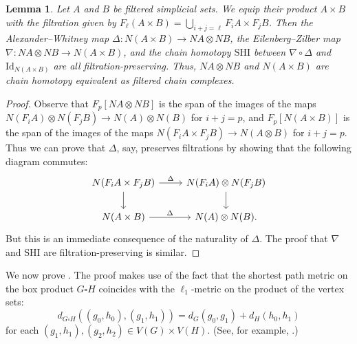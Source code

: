 \documentclass[a4paper, 11 pt, oneside, reqno]{amsart}
\newtheorem{lemma}{Lemma}
\numberwithin{lemma}{section}
\theoremstyle{definition}
\begin{document}
\begin{lemma}\label{lemma-EZ-filtered}
    Let $A$ and $B$ be filtered simplicial sets. We equip their product $A\times B$ with the filtration given by $F_\ell (A\times B) = \bigcup_{i+j=\ell} F_iA\times F_jB$.
    Then the Alexander--Whitney map
    $\Delta\colon N(A\times B)\to NA\otimes NB$, the Eilenberg--Zilber map
    $\nabla\colon NA\otimes NB\to N(A\times B)$,
    and the chain homotopy $\mathrm{SHI}$
    between $\nabla\circ\Delta$ 
    and $\mathrm{Id}_{N(A\times B)}$
    are all filtration-preserving.
    Thus, $NA\otimes NB$ and $N(A\times B)$ 
    are chain homotopy equivalent as filtered chain
    complexes.
\end{lemma}

\begin{proof}
    Observe that 
    $F_p[NA\otimes NB]$ is the span of the images
    of the maps $N(F_iA)\otimes N(F_jB)\to N(A)\otimes N(B)$
    for $i+j=p$,
    and $F_p[N(A\times B)]$ is the span of the images
    of the maps $N(F_iA\times F_jB)\to N(A\otimes B)$
    for $i+j=p$.
    Thus we can prove that $\Delta$, say, preserves 
    filtrations by showing that the following
    diagram commutes:
    \[
    \begin{tikzcd}
        N(F_iA\times F_jB)
        \arrow{r}{\Delta}
        \arrow{d}
        &
        N(F_iA) \otimes N(F_jB)
        \arrow{d}
        \\
        N(A\times B)\arrow{r}{\Delta}
        &
        N(A) \otimes N(B).
    \end{tikzcd}
    \]
    But this is an immediate consequence of the
    naturality of $\Delta$.
    The proof that $\nabla$ and $\mathrm{SHI}$
    are filtration-preserving is similar.
\end{proof}

We now prove . The proof makes use of the fact that the shortest path metric on the box product \(G \square H\) coincides with the \(\ell_1\)-metric on the product of the vertex sets:
\begin{equation}\label{eq:box_ell1}
    d_{G \square H}((g_0,h_0),(g_1,h_1)) = d_G(g_0,g_1) + d_H(h_0,h_1)
\end{equation}
for each \((g_1,h_1), (g_2, h_2) \in V(G) \times V(H)\). (See, for example, \cite[Corollary 1.3]{DIMZ}.) 
    
\end{document}
